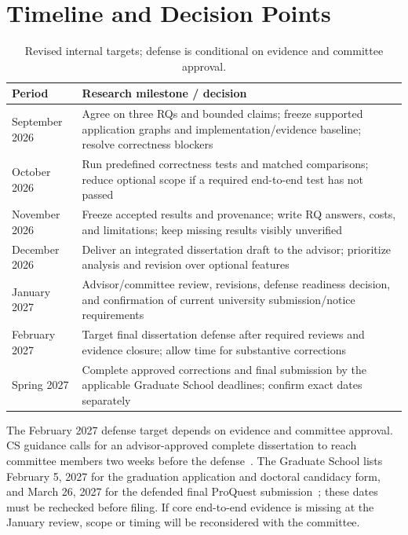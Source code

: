 \section{Timeline and Decision Points}
\begin{table}[H]
\centering\small
\caption{Revised internal targets; defense is conditional on evidence and committee approval.}
\begin{tabularx}{\textwidth}{p{}X}
\toprule
Period & Research milestone / decision\\\midrule
September 2026 & Agree on three RQs and bounded claims; freeze supported application graphs and implementation/evidence baseline; resolve correctness blockers\\\midrule
October 2026 & Run predefined correctness tests and matched comparisons; reduce optional scope if a required end-to-end test has not passed\\\midrule
November 2026 & Freeze accepted results and provenance; write RQ answers, costs, and limitations; keep missing results visibly unverified\\\midrule
December 2026 & Deliver an integrated dissertation draft to the advisor; prioritize analysis and revision over optional features\\\midrule
January 2027 & Advisor/committee review, revisions, defense readiness decision, and confirmation of current university submission/notice requirements\\\midrule
February 2027 & Target final dissertation defense after required reviews and evidence closure; allow time for substantive corrections\\\midrule
Spring 2027 & Complete approved corrections and final submission by the applicable Graduate School deadlines; confirm exact dates separately\\\bottomrule
\end{tabularx}
\end{table}

The February 2027 defense target depends on evidence and committee approval. CS guidance calls for an advisor-approved complete dissertation to reach committee members two weeks before the defense~\cite{memphiscsdefense}. The Graduate School lists February 5, 2027 for the graduation application and doctoral candidacy form, and March 26, 2027 for the defended final ProQuest submission~\cite{memphisgraduation}; these dates must be rechecked before filing. If core end-to-end evidence is missing at the January review, scope or timing will be reconsidered with the committee.

